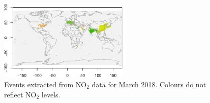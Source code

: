 \documentclass[a4paper,11pt]{article}
\begin{document}
\begin{figure}[!htb]
	\centering
		\includegraphics[width=0.55\textwidth]{./Graphics/Clusters_NO2_March_2018_With_Bndry.pdf}
	\caption{Events extracted from $\text{NO}_2$ data for March 2018. Colours do not reflect $\text{NO}_2$ levels.}
	\label{fig:ClustersNO2March2018}
\end{figure}
\end{document}
